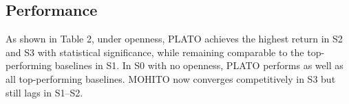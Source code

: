 \subsection{Performance}\label{sub:performance}
As shown in Table 2, under openness, PLATO achieves the highest return in S2 and S3 with statistical significance, while remaining comparable to the top-performing baselines in S1. In S0 with no openness, PLATO performs as well as all top-performing baselines. MOHITO now converges competitively in S3 but still lags in S1--S2.



